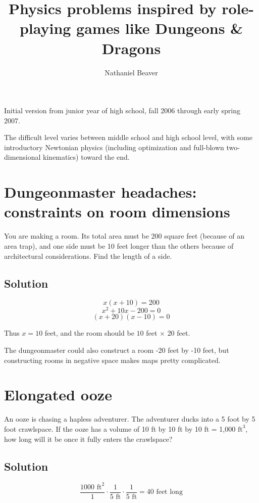 \documentclass[12pt,letterpaper]{article}
\author{Nathaniel Beaver}
\title{Physics problems inspired by role-playing games like Dungeons \& Dragons}
\begin{document}
\maketitle

Initial version from junior year of high school, fall 2006 through early spring 2007.

The difficult level varies between middle school and high school level, with some introductory Newtonian physics (including optimization and full-blown two-dimensional kinematics) toward the end.

\section{Dungeonmaster headaches: constraints on room dimensions}

You are making a room. Its total area must be 200 square feet (because of an area trap), and one side must be 10 feet longer than the others because of architectural considerations. Find the length of a side.

\subsection{Solution}

\[x(x+10) = 200\]
\[x^2 + 10x - 200 = 0\]
\[(x+20)(x-10) = 0\]

Thus $x = 10$ feet, and the room should be $10$ feet $\times$ $20$ feet.

The dungeonmaster could also construct a room -20 feet by -10 feet, but constructing rooms in negative space makes maps pretty complicated.

\section{Elongated ooze}

An ooze is chasing a hapless adventurer. The adventurer ducks into a 5 foot by 5 foot crawlspace. If the ooze has a volume of 10 ft by 10 ft by 10 ft = 1,000 $\textrm{ft}^3$, how long will it be once it fully enters the crawlspace?

\subsection{Solution}

\[
\frac{1000 \textrm{ ft}^2}{1}
\cdot
\frac{1}{5 \textrm{ ft}}
\cdot
\frac{1}{5 \textrm{ ft}}
=
40 \textrm{ feet long}
\]
\end{document}
